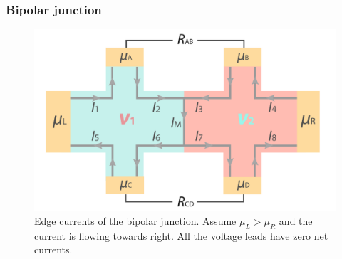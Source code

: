 \documentclass[pdflatex, sectionletters, 12pt]{pittetd}    %
\begin{document}
\subsubsection{Bipolar junction}

\begin{figure}[h!]
	\centering
	\includegraphics[width=.7\textwidth]{Drawing/Bipolar.pdf}
	\caption{Edge currents of the bipolar junction. Assume $\mu_L > \mu_R$ and the current is flowing towards right. All the voltage leads have zero net currents.}
	\label{FIG:Bipolar}
\end{figure}
\end{document}
